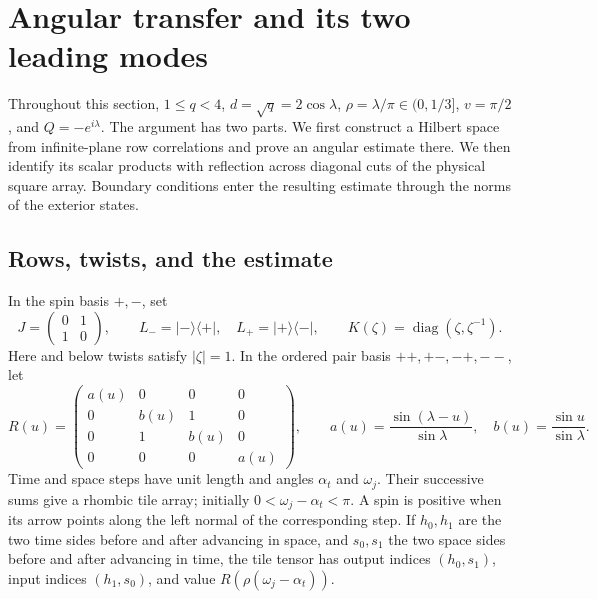 \section{Angular transfer and its two leading modes}\label{sec:angular}

Throughout this section, $1\le q<4$, $d=\sqrt q=2\cos\lambda$,
$\rho=\lambda/\pi\in(0,1/3]$, $v=\pi/2$, and $Q=-e^{i\lambda}$.
The argument has two parts. We first construct a Hilbert space from
infinite-plane row correlations and prove an angular estimate there. We
then identify its scalar products with reflection across diagonal cuts
of the physical square array. Boundary conditions enter the resulting
estimate through the norms of the exterior states.

\subsection{Rows, twists, and the estimate}

In the spin basis $+,-$, set
\[
 J=\begin{pmatrix}0&1\\1&0\end{pmatrix},\qquad
 L_-=|-\rangle\langle+|,\quad L_+=|+\rangle\langle-|,
 \qquad K(\zeta)=\operatorname{diag}(\zeta,\zeta^{-1}).
\]
Here and below twists satisfy $|\zeta|=1$. In the ordered pair basis
$++,+-,-+,--$, let
\begin{equation}\label{bulk:R}
 R(u)=\begin{pmatrix}
 a(u)&0&0&0\\0&b(u)&1&0\\0&1&b(u)&0\\0&0&0&a(u)
 \end{pmatrix},\qquad
 a(u)=\frac{\sin(\lambda-u)}{\sin\lambda},\quad
 b(u)=\frac{\sin u}{\sin\lambda}.
\end{equation}
Time and space steps have unit length and angles $\alpha_t$ and
$\omega_j$. Their successive sums give a rhombic tile array; initially
$0<\omega_j-\alpha_t<\pi$. A spin is positive when its arrow points
along the left normal of the corresponding step. If $h_0,h_1$ are the
two time sides before and after advancing in space, and $s_0,s_1$ the
two space sides before and after advancing in time, the tile tensor
has output indices $(h_0,s_1)$, input indices $(h_1,s_0)$, and value
$R(\rho(\omega_j-\alpha_t))$.

